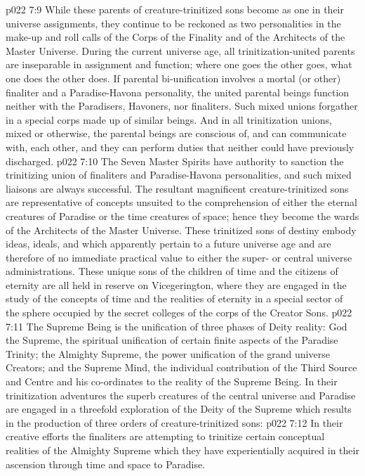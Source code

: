 \vs p022 7:9 While these parents of creature\hyp{}trinitized sons become as one in their universe assignments, they continue to be reckoned as two personalities in the make\hyp{}up and roll calls of the Corps of the Finality and of the Architects of the Master Universe. During the current universe age, all trinitization\hyp{}united parents are inseparable in assignment and function; where one goes the other goes, what one does the other does. If parental bi\hyp{}unification involves a mortal (or other) finaliter and a Paradise\hyp{}Havona personality, the united parental beings function neither with the Paradisers, Havoners, nor finaliters. Such mixed unions forgather in a special corps made up of similar beings. And in all trinitization unions, mixed or otherwise, the parental beings are conscious of, and can communicate with, each other, and they can perform duties that neither could have previously discharged.
\vs p022 7:10 \pc The Seven Master Spirits have authority to sanction the trinitizing union of finaliters and Paradise\hyp{}Havona personalities, and such mixed liaisons are always successful. The resultant magnificent creature\hyp{}trinitized sons are representative of concepts unsuited to the comprehension of either the eternal creatures of Paradise or the time creatures of space; hence they become the wards of the Architects of the Master Universe. These trinitized sons of destiny embody ideas, ideals, and  which apparently pertain to a future universe age and are therefore of no immediate practical value to either the super\hyp{} or central universe administrations. These unique sons of the children of time and the citizens of eternity are all held in reserve on Vicegerington, where they are engaged in the study of the concepts of time and the realities of eternity in a special sector of the sphere occupied by the secret colleges of the corps of the Creator Sons.
\vs p022 7:11 \pc The Supreme Being is the unification of three phases of Deity reality: God the Supreme, the spiritual unification of certain finite aspects of the Paradise Trinity; the Almighty Supreme, the power unification of the grand universe Creators; and the Supreme Mind, the individual contribution of the Third Source and Centre and his co\hyp{}ordinates to the reality of the Supreme Being. In their trinitization adventures the superb creatures of the central universe and Paradise are engaged in a threefold exploration of the Deity of the Supreme which results in the production of three orders of creature\hyp{}trinitized sons:
\vs p022 7:12 \bibnobreakspace {} In their creative efforts the finaliters are attempting to trinitize certain conceptual realities of the Almighty Supreme which they have experientially acquired in their ascension through time and space to Paradise.
